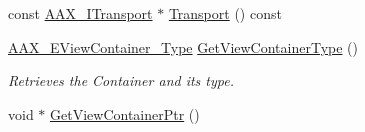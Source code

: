 \begin{Indent}
\begin{DoxyCompactItemize}
const \mbox{\hyperlink{a01885}{A\+A\+X\+\_\+\+I\+Transport}} $\ast$ \mbox{\hyperlink{a01477_a7330c595add500a079761e24e6067d57}{Transport}} () const
\item 
\mbox{\hyperlink{a00503_a89d5cb8c7fdb11f34e695fb0e057b764}{A\+A\+X\+\_\+\+E\+View\+Container\+\_\+\+Type}} \mbox{\hyperlink{a01477_a010cc00926a3d219fa4de47ac182eb9b}{Get\+View\+Container\+Type}} ()
\begin{DoxyCompactList}\small\item\em Retrieves the Container and it\textquotesingle{}s type. \end{DoxyCompactList}\item 
void $\ast$ \mbox{\hyperlink{a01477_a0bd9e15c41584fb9a53ff5724e5db330}{Get\+View\+Container\+Ptr}} ()
\end{DoxyCompactItemize}
\end{Indent}
